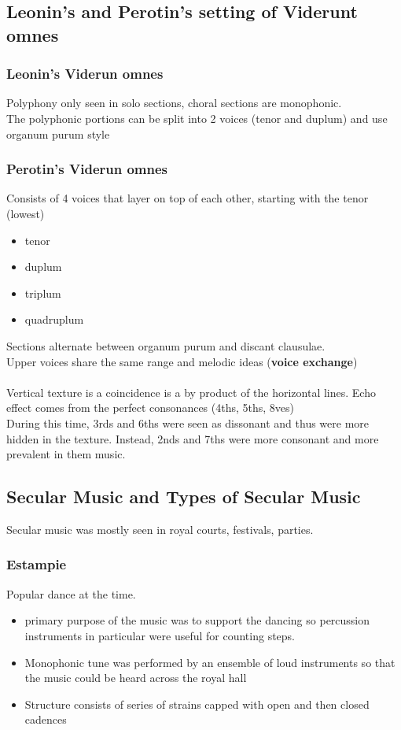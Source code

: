 \documentclass{article}
\begin{document}
  \subsection{Leonin's and Perotin's setting of Viderunt omnes}
  \subsubsection{Leonin's Viderun omnes}
  Polyphony only seen in solo sections, choral sections are monophonic. \\
  The polyphonic portions can be split into 2 voices (tenor and duplum) and use organum purum style
  \subsubsection{Perotin's Viderun omnes}
  Consists of 4 voices that layer on top of each other, starting with the tenor (lowest)
  \begin{itemize}
    \item tenor
    \item duplum
    \item triplum
    \item quadruplum
  \end{itemize}
  Sections alternate between organum purum and discant clausulae. \\
  Upper voices share the same range and melodic ideas (\textbf{voice exchange}) \\ \\
  Vertical texture is a coincidence is a by product of the horizontal lines. Echo effect comes from the perfect consonances (4ths, 5ths, 8ves) \\
  During this time, 3rds and 6ths were seen as dissonant and thus were more hidden in the texture. Instead, 2nds and 7ths were more consonant and more prevalent in them music.
  \subsection{Secular Music and Types of Secular Music}
  Secular music was mostly seen in royal courts, festivals, parties.
  \subsubsection{Estampie}
  Popular dance at the time. 
  \begin{itemize}
    \item primary purpose of the music was to support the dancing so percussion instruments in particular were useful for counting steps.
    \item Monophonic tune was performed by an ensemble of loud instruments so that the music could be heard across the royal hall
    \item Structure consists of series of strains capped with open and then closed cadences
  \end{itemize}
\end{document}
